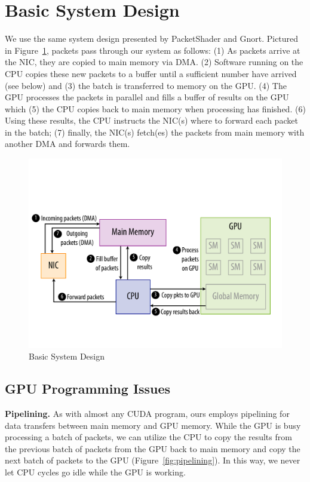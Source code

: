 \section{Basic System Design}
\label{sec:system-design}

We use the same system design presented by PacketShader and Gnort. Pictured in
Figure~\ref{fig:system}, packets pass through our system as follows: (1) As
packets arrive at the NIC, they are copied to main memory via DMA. (2) Software
running on the CPU copies these new packets to a buffer until a sufficient
number have arrived (see below) and (3) the batch is transferred to memory on
the GPU. (4) The GPU processes the packets in parallel and fills a buffer of
results on the GPU which (5) the CPU copies back to main memory when processing
has finished. (6) Using these results, the CPU instructs the NIC(s) where to
forward each packet in the batch; (7) finally, the NIC(s) fetch(es) the packets
from main memory with another DMA and forwards them.

\begin{figure}
   \centering
   \includegraphics[scale=0.23]{figs/system_overview.pdf} 
   \caption{Basic System Design}
   \label{fig:system}
\end{figure}

\subsection{GPU Programming Issues}
\label{sec:gpu-issues}

\noindent \textbf{Pipelining.} As with almost any CUDA program, ours employs
pipelining for data transfers between main memory and GPU memory. While the GPU
is busy processing a batch of packets, we can utilize the CPU to copy the
results from the previous batch of packets from the GPU back to main memory and
copy the next batch of packets to the GPU (Figure~\ref{fig:pipelining}). In
this way, we never let CPU cycles go idle while the GPU is working.\\

